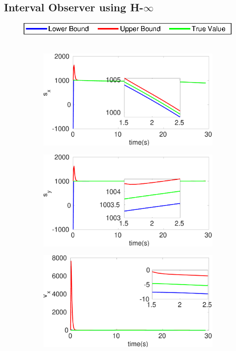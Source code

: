 \clearpage
\subsection{Interval Observer using H-$\infty$}\label{eresult:hinf}
\FloatBarrier
\begin{figure}[!h]
\hspace*{\fill} \includegraphics[scale=0.8]{figures/legend}\\\\
\begin{subfigure}{.5\linewidth}
\centering
\includegraphics[width=\linewidth]{figures/HInf/s3cvHInfs_x}
\end{subfigure}
\begin{subfigure}{.5\linewidth}
\centering
\includegraphics[width=\linewidth]{figures/HInf/s3cvHInfs_y}
\end{subfigure}
\begin{subfigure}{.5\linewidth}
\centering
\includegraphics[width=\linewidth]{figures/HInf/s3cvHInfv_x}

\end{subfigure}
\end{figure}
